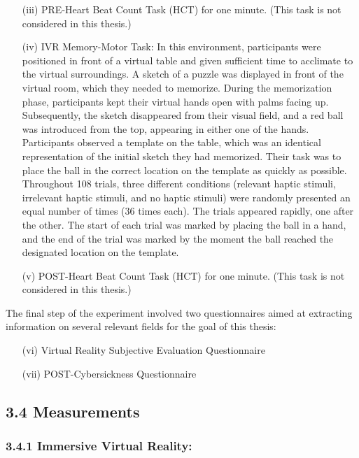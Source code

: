 \documentclass[12pt,oneside,openright]{report}
\begin{document}
\begin{enumerate}
\item[(iii)] PRE-Heart Beat Count Task (HCT) for one minute. (This task is not considered in this thesis.)
\item[(iv)] IVR Memory-Motor Task: In this environment, participants were positioned in front of a virtual table and given sufficient time to acclimate to the virtual surroundings. A sketch of a puzzle was displayed in front of the virtual room, which they needed to memorize. During the memorization phase, participants kept their virtual hands open with palms facing up. Subsequently, the sketch disappeared from their visual field, and a red ball was introduced from the top, appearing in either one of the hands. Participants observed a template on the table, which was an identical representation of the initial sketch they had memorized. Their task was to place the ball in the correct location on the template as quickly as possible. Throughout 108 trials, three different conditions (relevant haptic stimuli, irrelevant haptic stimuli, and no haptic stimuli) were randomly presented an equal number of times (36 times each). The trials appeared rapidly, one after the other. The start of each trial was marked by placing the ball in a hand, and the end of the trial was marked by the moment the ball reached the designated location on the template.
\item[(v)] POST-Heart Beat Count Task (HCT) for one minute. (This task is not considered in this thesis.)
\end{enumerate}

The final step of the experiment involved two questionnaires aimed at extracting information on several relevant fields for the goal of this thesis:

\begin{enumerate}
\item[(vi)] Virtual Reality Subjective Evaluation Questionnaire
\item[(vii)] POST-Cybersickness Questionnaire
\end{enumerate}

\subsection*{3.4 Measurements}

\subsubsection*{3.4.1 Immersive Virtual Reality:}
\end{document}
